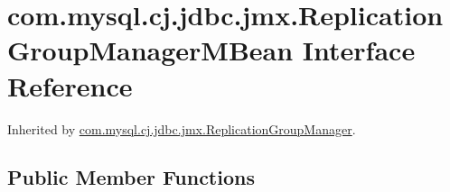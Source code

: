 \hypertarget{interfacecom_1_1mysql_1_1cj_1_1jdbc_1_1jmx_1_1_replication_group_manager_m_bean}{}\section{com.\+mysql.\+cj.\+jdbc.\+jmx.\+Replication\+Group\+Manager\+M\+Bean Interface Reference}
\label{interfacecom_1_1mysql_1_1cj_1_1jdbc_1_1jmx_1_1_replication_group_manager_m_bean}


Inherited by \mbox{\hyperlink{classcom_1_1mysql_1_1cj_1_1jdbc_1_1jmx_1_1_replication_group_manager}{com.\+mysql.\+cj.\+jdbc.\+jmx.\+Replication\+Group\+Manager}}.

\subsection*{Public Member Functions}
